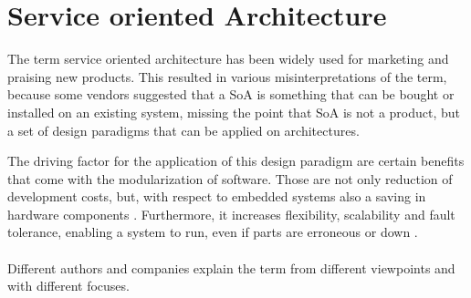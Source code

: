 \section{Service oriented Architecture}
\label{ch:soa}

The term service oriented architecture has been widely used for marketing and praising new products. This resulted in various misinterpretations of the term, because some vendors suggested that a SoA is something that can be bought or installed on an existing system, missing the point that SoA is not a product, but a set of design paradigms that can be applied on architectures.

The driving factor for the application of this design paradigm are certain benefits that come with the modularization of software. Those are not only reduction of development costs, but, with respect to embedded systems also a saving in hardware components \cite{sommer}. Furthermore, it increases flexibility, scalability and fault tolerance, enabling a system to run, even if parts are erroneous or down \cite[p.33]{rosen} \cite[p.17-18]{josuttis}.
\\
\\
Different authors and companies explain the term from different viewpoints and with different focuses.

